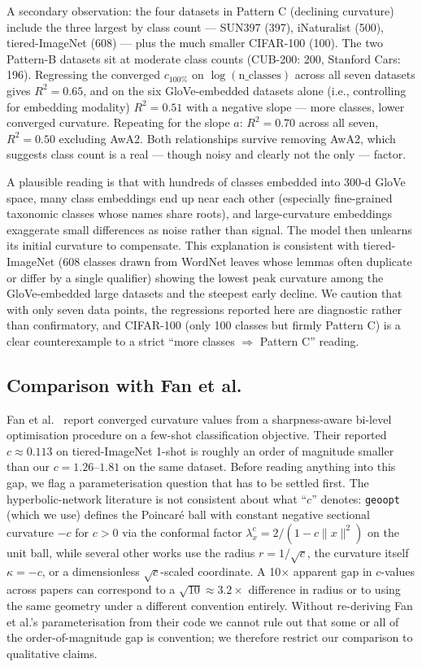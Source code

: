 \documentclass{article}
\begin{document}
A secondary observation: the four datasets in Pattern C (declining curvature) include the three largest by class count --- SUN397 (397), iNaturalist (500), tiered-ImageNet (608) --- plus the much smaller CIFAR-100 (100).
The two Pattern-B datasets sit at moderate class counts (CUB-200: 200, Stanford Cars: 196).
Regressing the converged $c_{100\%}$ on $\log(\text{n\_classes})$ across all seven datasets gives $R^2 = 0.65$, and on the six GloVe-embedded datasets alone (i.e., controlling for embedding modality) $R^2 = 0.51$ with a negative slope --- more classes, lower converged curvature.
Repeating for the slope $a$: $R^2 = 0.70$ across all seven, $R^2 = 0.50$ excluding AwA2.
Both relationships survive removing AwA2, which suggests class count is a real --- though noisy and clearly not the only --- factor.

A plausible reading is that with hundreds of classes embedded into 300-d GloVe space, many class embeddings end up near each other (especially fine-grained taxonomic classes whose names share roots), and large-curvature embeddings exaggerate small differences as noise rather than signal.
The model then unlearns its initial curvature to compensate.
This explanation is consistent with tiered-ImageNet (608 classes drawn from WordNet leaves whose lemmas often duplicate or differ by a single qualifier) showing the lowest peak curvature among the GloVe-embedded large datasets and the steepest early decline.
We caution that with only seven data points, the regressions reported here are diagnostic rather than confirmatory, and CIFAR-100 (only 100 classes but firmly Pattern C) is a clear counterexample to a strict ``more classes $\Rightarrow$ Pattern C'' reading.

\subsection{Comparison with Fan et al.}\label{sec:fan_comparison}

Fan et al.~\cite{fan2025curvature} report converged curvature values from a sharpness-aware bi-level optimisation procedure on a few-shot classification objective.
Their reported $c \approx 0.113$ on tiered-ImageNet 1-shot is roughly an order of magnitude smaller than our $c = 1.26$--$1.81$ on the same dataset.
Before reading anything into this gap, we flag a parameterisation question that has to be settled first.
The hyperbolic-network literature is not consistent about what ``$c$'' denotes: \texttt{geoopt}~\cite{kochurov2020geoopt} (which we use) defines the Poincar\'{e} ball with constant negative sectional curvature $-c$ for $c > 0$ via the conformal factor $\lambda^c_x = 2/(1 - c\|x\|^2)$ on the unit ball, while several other works use the radius $r = 1/\sqrt{c}$, the curvature itself $\kappa = -c$, or a dimensionless $\sqrt{c}$-scaled coordinate.
A 10$\times$ apparent gap in $c$-values across papers can correspond to a $\sqrt{10} \approx 3.2\times$ difference in radius or to using the same geometry under a different convention entirely.
Without re-deriving Fan et al.'s parameterisation from their code we cannot rule out that some or all of the order-of-magnitude gap is convention; we therefore restrict our comparison to qualitative claims.
\end{document}
